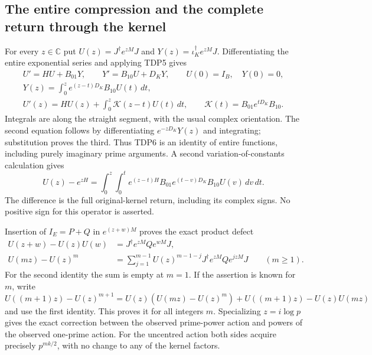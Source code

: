 \subsection{The entire compression and the complete return through the kernel}

For every $z\in\mathbb C$ put $U(z)=J^\dagger e^{zM}J$ and
$Y(z)=\iota_K^\dagger e^{zM}J$. Differentiating the entire exponential
series and applying TDP5 gives
\begin{equation}\tag{TDP6}
\begin{gathered}
U'=HU+B_{01}Y,\qquad Y'=B_{10}U+D_KY,\qquad U(0)=I_B,\quad Y(0)=0,\\
Y(z)=\int_0^z e^{(z-t)D_K}B_{10}U(t)\,dt,\\
U'(z)=HU(z)+\int_0^z\mathcal K(z-t)U(t)\,dt,
\qquad \mathcal K(t)=B_{01}e^{tD_K}B_{10}.
\end{gathered}
\end{equation}
Integrals are along the straight segment, with the usual complex
orientation. The second equation follows by differentiating
$e^{-zD_K}Y(z)$ and integrating; substitution proves the third.
Thus TDP6 is an identity of entire functions, including purely imaginary
prime arguments. A second variation-of-constants calculation gives
\begin{equation}\tag{TDP7}
U(z)-e^{zH}=
\int_0^z\!\int_0^t
 e^{(z-t)H}B_{01}e^{(t-v)D_K}B_{10}U(v)\,dv\,dt.
\end{equation}
The difference is the full original-kernel return, including its complex
signs. No positive sign for this operator is asserted.

Insertion of $I_E=P+Q$ in $e^{(z+w)M}$ proves the exact product defect
\begin{equation}\tag{TDP8}
\begin{aligned}
U(z+w)-U(z)U(w)
 &=J^\dagger e^{zM}Qe^{wM}J,\\
U(mz)-U(z)^m
 &=\sum_{j=1}^{m-1}U(z)^{m-1-j}
   J^\dagger e^{zM}Qe^{jzM}J\qquad(m\ge1).
\end{aligned}
\end{equation}
For the second identity the sum is empty at $m=1$. If the assertion is
known for $m$, write
$U((m+1)z)-U(z)^{m+1}=U(z)(U(mz)-U(z)^m)
+U((m+1)z)-U(z)U(mz)$ and use the first identity. This proves it for
all integers $m$. Specializing $z=i\log p$ gives the exact correction
between the observed prime-power action and powers of the observed
one-prime action. For the uncentred action both sides acquire precisely
$p^{mk/2}$, with no change to any of the kernel factors.

